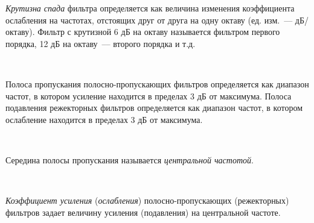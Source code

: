 \documentclass{beamer}
\begin{document}
\begin{frame}
\emph{Крутизна спада} фильтра определяется как величина изменения коэффициента ослабления на частотах, отстоящих друг от друга на одну октаву (ед. изм.~--– дБ/октаву). Фильтр с крутизной 6 дБ на октаву называется фильтром первого порядка, 12 дБ на октаву~--– второго порядка и т.д.

~

Полоса пропускания полосно-пропускающих фильтров определяется как диапазон частот, в котором усиление находится в пределах 3 дБ от максимума. Полоса подавления режекторных фильтров определяется как диапазон частот, в котором ослабление находится в пределах 3 дБ от максимума.

~

Середина полосы пропускания называется \emph{центральной частотой}.

~

\emph{Коэффициент усиления} (\emph{ослабления}) полосно-пропускающих (режекторных) фильтров задает величину усиления (подавления) на центральной частоте.
\end{frame}

\begin{frame}
\end{frame}

\begin{frame}
\end{frame}
\end{document}
